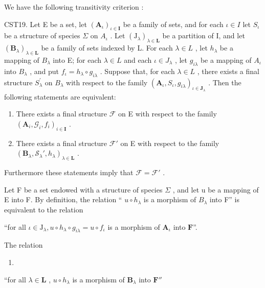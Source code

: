 We have the following transitivity criterion :

CST19. Let E be a set, let \((\mathbf{A}_{\iota})_{\iota\in\mathbf{I}}\) be a family of sets, and for each \(\iota\in I\) let \(S_{\iota}\) be a structure of species \(\Sigma\) on \(A_{\iota}\) . Let \((\mathrm{J}_{\lambda})_{\lambda\in\mathbf{L}}\) be a partition of I, and let \((\mathbf{B}_{\lambda})_{\lambda\in\mathbf{L}}\) be a family of sets indexed by L. For each \(\lambda\in L\) , let \(h_{\lambda}\) be a mapping of \(B_{\lambda}\) into E; for each \(\lambda\in L\) and each \(\iota\in J_{\lambda}\) , let \(g_{i\lambda}\) be a mapping of \(A_{\iota}\) into \(B_{\lambda}\) , and put \(f_{\iota}=h_{\lambda}\circ g_{i\lambda}\) . Suppose that, for each \(\lambda\in L\) , there exists a final structure \(S_{\lambda}^{\prime}\) on \(B_{\lambda}\) with respect to the family \((\mathbf{A}_{\iota},S_{\iota},g_{i\lambda})_{\iota\in\mathbf{J}_{\lambda}}\) . Then the following statements are equivalent:

\begin{enumerate}
\def\labelenumi{(\alph{enumi})}
\item
  There exists a final structure \(\mathcal{F}\) on E with respect to the family \((\mathbf{A}_i, \mathcal{G}_i, f_i)_{i \in \mathbf{I}}\) .
\item
  There exists a final structure \(\mathcal{F}'\) on E with respect to the family \((\mathbf{B}_{\lambda}, \mathcal{S}_{\lambda}', h_{\lambda})_{\lambda \in \mathbf{L}}\) .
\end{enumerate}

Furthermore these statements imply that \(\mathcal{F} = \mathcal{F}'\) .

Let F be a set endowed with a structure of species \(\Sigma\) , and let u be a mapping of E into F. By definition, the relation `` \(u \circ h_{\lambda}\) is a morphism of \(B_{\lambda}\) into F'' is equivalent to the relation

``for all \(\iota\in\mathrm{J}_{\lambda}, u\circ h_{\lambda}\circ g_{i\lambda}=u\circ f_{\iota}\) is a morphism of \(\mathbf{A}_{\iota}\) into \(\mathbf{F}\)''.

The relation

\begin{enumerate}
\def\labelenumi{(\arabic{enumi})}
\setcounter{enumi}{2}
\tightlist
\item
\end{enumerate}

``for all \(\lambda \in \mathbf{L}\) , \(u \circ h_{\lambda}\) is a morphism of \(\mathbf{B}_{\lambda}\) into \(\mathbf{F}''\)

